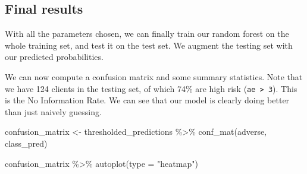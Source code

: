 \documentclass[
]{article}
\newenvironment{Shaded}{\begin{snugshade}}{\end{snugshade}}
\newcommand{\AttributeTok}[1]{\textcolor[rgb]{0.77,0.63,0.00}{#1}}
\newcommand{\FunctionTok}[1]{\textcolor[rgb]{0.00,0.00,0.00}{#1}}
\newcommand{\NormalTok}[1]{#1}
\newcommand{\OtherTok}[1]{\textcolor[rgb]{0.56,0.35,0.01}{#1}}
\newcommand{\SpecialCharTok}[1]{\textcolor[rgb]{0.00,0.00,0.00}{#1}}
\newcommand{\StringTok}[1]{\textcolor[rgb]{0.31,0.60,0.02}{#1}}
\begin{document}
\hypertarget{final-results}{%
\subsection{Final results}\label{final-results}}

With all the parameters chosen, we can finally train our random forest
on the whole training set, and test it on the test set. We augment the
testing set with our predicted probabilities.

\begin{Shaded}
\end{Shaded}

We can now compute a confusion matrix and some summary statistics. Note
that we have 124 clients in the testing set, of which 74\% are high risk
(\texttt{ae\ \textgreater{}\ 3}). This is the No Information Rate. We
can see that our model is clearly doing better than just naively
guessing.

\begin{Shaded}
\begin{Highlighting}[]
\NormalTok{confusion\_matrix }\OtherTok{\textless{}{-}}
\NormalTok{  thresholded\_predictions }\SpecialCharTok{\%\textgreater{}\%}
  \FunctionTok{conf\_mat}\NormalTok{(adverse, class\_pred)}

\NormalTok{confusion\_matrix }\SpecialCharTok{\%\textgreater{}\%} \FunctionTok{autoplot}\NormalTok{(}\AttributeTok{type =} \StringTok{"heatmap"}\NormalTok{)}
\end{Highlighting}
\end{Shaded}
\end{document}
